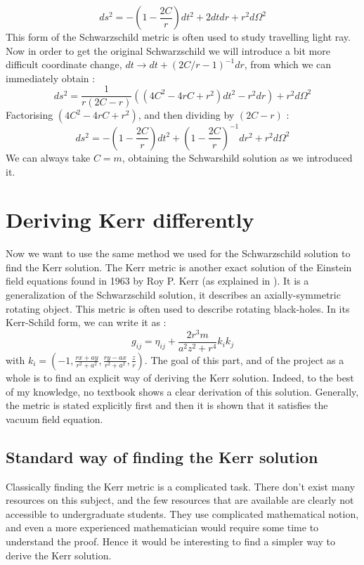 \documentclass[a4paper,12pt]{article}
\theoremstyle{definition}
\begin{document}
\begin{equation}
	ds^2=-(1-\frac{2C}{r})dt^2+2dtdr+r^2d\Omega^2
\end{equation}
This form of the Schwarzschild metric is often used to study travelling light ray.
Now in order to get the original Schwarzschild we will introduce a bit more difficult coordinate change, $dt\rightarrow dt+(2C/r-1)^{-1}dr$, from which we can immediately obtain :
\begin{equation}
	ds^2=\frac{1}{r(2C-r)}((4C^2-4rC+r^2)dt^2-r^2dr)+r^2d\Omega^2
\end{equation}
Factorising $(4C^2-4rC+r^2)$, and then dividing by $(2C-r)$ :
\begin{equation}
	ds^2=-(1-\frac{2C}{r})dt^2+(1-\frac{2C}{r})^{-1}dr^2+r^2d\Omega^2
\end{equation}
We can always take $C=m$, obtaining the Schwarshild solution as we introduced it.

\section{Deriving Kerr differently}
Now we want to use the same method we used for the Schwarzschild solution to find the Kerr solution.
The Kerr metric is another exact solution of the Einstein field equations found in 1963 by Roy P. Kerr (as explained in \cite{Kerr}).
It is a generalization of the Schwarzschild solution, it describes an axially-symmetric rotating object.
This metric is often used to describe rotating black-holes.
In its Kerr-Schild form, we can write it as :
\begin{equation}
	g_{ij}=\eta_{ij}+\frac{2r^3m}{a^2 z^2+r^4}k_ik_j
\end{equation}
with $k_i=(-1,\frac{r x + a y}{r^2 + a^2},\frac{ry-ax}{r^2+a^2},\frac{z}{r})$.
The goal of this part, and of the project as a whole is to find an explicit way of deriving the Kerr solution.
Indeed, to the best of my knowledge, no textbook shows a clear derivation of this solution.
Generally, the metric is stated explicitly first and then it is shown that it satisfies the vacuum field equation.
\subsection{Standard way of finding the Kerr solution}
Classically finding the Kerr metric is a complicated task.
There don't exist many resources on this subject, and the few resources that are available are clearly not accessible to undergraduate students.
They use complicated mathematical notion, and even a more experienced mathematician would require some time to understand the proof.
Hence it would be interesting to find a simpler way to derive the Kerr solution.
\end{document}
